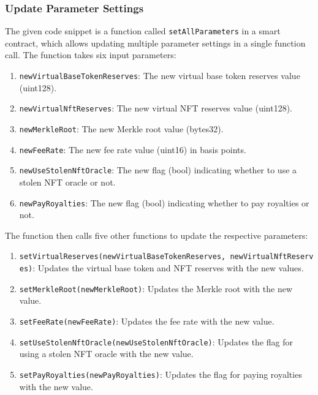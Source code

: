 \hypertarget{update-parameter-settings}{%
\subsubsection{Update Parameter
Settings}\label{update-parameter-settings}}

The given code snippet is a function called \texttt{setAllParameters} in
a smart contract, which allows updating multiple parameter settings in a
single function call. The function takes six input parameters:

\begin{enumerate}
\def\labelenumi{\arabic{enumi}.}
\tightlist
\item
  \texttt{newVirtualBaseTokenReserves}: The new virtual base token
  reserves value (uint128).
\item
  \texttt{newVirtualNftReserves}: The new virtual NFT reserves value
  (uint128).
\item
  \texttt{newMerkleRoot}: The new Merkle root value (bytes32).
\item
  \texttt{newFeeRate}: The new fee rate value (uint16) in basis points.
\item
  \texttt{newUseStolenNftOracle}: The new flag (bool) indicating whether
  to use a stolen NFT oracle or not.
\item
  \texttt{newPayRoyalties}: The new flag (bool) indicating whether to
  pay royalties or not.
\end{enumerate}

The function then calls five other functions to update the respective
parameters:

\begin{enumerate}
\def\labelenumi{\arabic{enumi}.}
\tightlist
\item
  \texttt{setVirtualReserves(newVirtualBaseTokenReserves,\ newVirtualNftReserves)}:
  Updates the virtual base token and NFT reserves with the new values.
\item
  \texttt{setMerkleRoot(newMerkleRoot)}: Updates the Merkle root with
  the new value.
\item
  \texttt{setFeeRate(newFeeRate)}: Updates the fee rate with the new
  value.
\item
  \texttt{setUseStolenNftOracle(newUseStolenNftOracle)}: Updates the
  flag for using a stolen NFT oracle with the new value.
\item
  \texttt{setPayRoyalties(newPayRoyalties)}: Updates the flag for paying
  royalties with the new value.
\end{enumerate}

